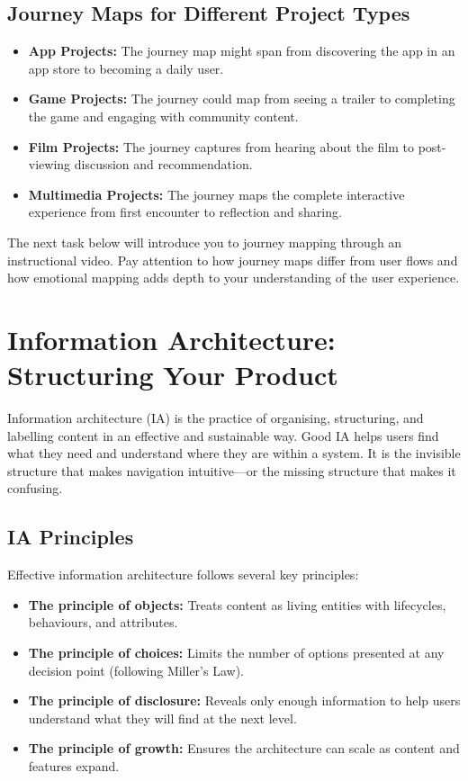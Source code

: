 \documentclass[12pt,a4paper]{article}
\begin{document}
\subsection*{Journey Maps for Different Project Types}
\begin{itemize}
    \item \textbf{App Projects:} The journey map might span from discovering the app in an app store to becoming a daily user.
    \item \textbf{Game Projects:} The journey could map from seeing a trailer to completing the game and engaging with community content.
    \item \textbf{Film Projects:} The journey captures from hearing about the film to post-viewing discussion and recommendation.
    \item \textbf{Multimedia Projects:} The journey maps the complete interactive experience from first encounter to reflection and sharing.
\end{itemize}

The next task below will introduce you to journey mapping through an instructional video. Pay attention to how journey maps differ from user flows and how emotional mapping adds depth to your understanding of the user experience.

\section*{Information Architecture: Structuring Your Product}
Information architecture (IA) is the practice of organising, structuring, and labelling content in an effective and sustainable way. Good IA helps users find what they need and understand where they are within a system. It is the invisible structure that makes navigation intuitive—or the missing structure that makes it confusing.

\subsection*{IA Principles}
Effective information architecture follows several key principles:
\begin{itemize}
    \item \textbf{The principle of objects:} Treats content as living entities with lifecycles, behaviours, and attributes.
    \item \textbf{The principle of choices:} Limits the number of options presented at any decision point (following Miller’s Law).
    \item \textbf{The principle of disclosure:} Reveals only enough information to help users understand what they will find at the next level.
    \item \textbf{The principle of growth:} Ensures the architecture can scale as content and features expand.
\end{itemize}
\end{document}
